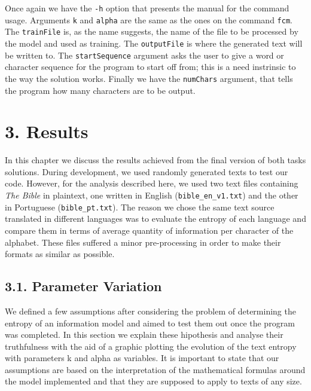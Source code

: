 \documentclass[12pt]{article}
\begin{document}
Once again we have the \texttt{-h} option that presents the manual for the 
command usage.
Arguments \texttt{k} and \texttt{alpha} are the same as the ones on the 
command \texttt{fcm}.
The \texttt{trainFile} is, as the name suggests, the name of the file to be
processed by the model and used as training.
The \texttt{outputFile} is where the generated text will be written to.
The \texttt{startSequence} argument asks the user to give a word or character
sequence for the program to start off from; this is a need instrinsic to the
way the solution works.
Finally we have the \texttt{numChars} argument, that tells the program how 
many characters are to be output.

\section*{3. Results}

In this chapter we discuss the results achieved from the final version of 
both tasks solutions. 
During development, we used randomly generated texts to test our code.
However, for the analysis described here, we used two text files
containing {\it The Bible\/} in plaintext, one written in English 
(\texttt{bible\_en\_v1.txt}) and the other in Portuguese 
(\texttt{bible\_pt.txt}).
The reason we chose the same text source translated in different languages
was to evaluate the entropy of each language and compare them in terms of 
average quantity of information per character of the alphabet.
These files suffered a minor pre-processing in order to make their formats 
as similar as possible.

\subsection*{3.1. Parameter Variation}

We defined a few assumptions after considering the problem of determining
the entropy of an information model and aimed to test them out once the 
program was completed.
In this section we explain these hipothesis and analyse their truthfulness
with the aid of a graphic plotting the evolution of the text entropy with
parameters k and alpha as variables.
It is important to state that our assumptions are based on the interpretation
of the mathematical formulas around the model implemented and that they 
are supposed to apply to texts of any size.
\end{document}
